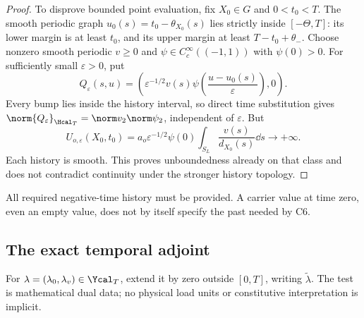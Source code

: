\begin{proof}
To disprove bounded point evaluation, fix $X_0\in G$ and $0<t_0<T$. The smooth periodic graph $u_0(s)=t_0-\theta_{X_0}(s)$ lies strictly inside $[-\Theta,T]$: its lower margin is at least $t_0$, and its upper margin at least $T-t_0+\theta_-$. Choose nonzero smooth periodic $v\ge0$ and $\psi\in C_c^\infty((-1,1))$ with $\psi(0)>0$. For sufficiently small $\varepsilon>0$, put
\begin{equation}\label{eq:narrowgraph}
Q_\varepsilon(s,u)=\left(\varepsilon^{-1/2}v(s)
\psi\!\left(\frac{u-u_0(s)}{\varepsilon}\right),0\right).
\end{equation}
Every bump lies inside the history interval, so direct time substitution gives
$\norm{Q_\varepsilon}_{\Hcal_T}=\norm v_2\norm\psi_2$, independent of $\varepsilon$. But
\begin{equation}\label{eq:pointunbounded}
U_{o,\varepsilon}(X_0,t_0)=a_o\varepsilon^{-1/2}\psi(0)
\int_{S_L}\frac{v(s)}{d_{X_0}(s)}\dd s\longrightarrow+\infty.
\end{equation}
Each history is smooth. This proves unboundedness already on that class and does not contradict continuity under the stronger history topology.
\end{proof}

All required negative-time history must be provided. A carrier value at time zero, even an empty value, does not by itself specify the past needed by C6.

\subsection{The exact temporal adjoint}
For $\lambda=(\lambda_0,\lambda_v)\in\Ycal_T$, extend it by zero outside $[0,T]$, writing $\widetilde\lambda$. The test is mathematical dual data; no physical load units or constitutive interpretation is implicit.

